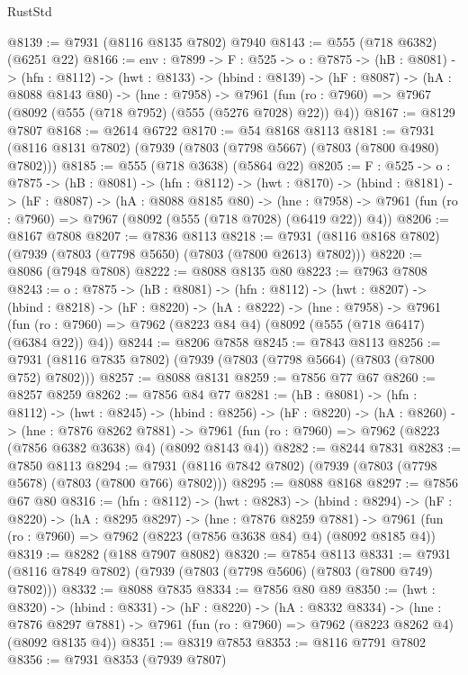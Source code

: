 \begin{lexlean}{RustStd}
\begin{coremodule}
@8139 := @7931 (@8116 @8135 @7802) @7940
@8143 := @555 (@718 @6382) (@6251 @22)
@8166 := {env : @7899} ->
  {F : @525} ->
  {o : @7875} ->
  (hB : @8081) ->
  (hfn : @8112) ->
  (hwt : @8133) ->
  (hbind : @8139) ->
  (hF : @8087) ->
  (hA : @8088 @8143 @80) ->
  (hne : @7958) ->
  @7961 (fun (ro : @7960) => @7967 (@8092 (@555 (@718 @7952) (@555 (@5276 @7028) @22)) @4))
@8167 := @8129 @7807
@8168 := @2614 @6722
@8170 := @54 @8168 @8113
@8181 := @7931 (@8116 @8131 @7802) (@7939 (@7803 (@7798 @5667) (@7803 (@7800 @4980) @7802)))
@8185 := @555 (@718 @3638) (@5864 @22)
@8205 := {F : @525} ->
  {o : @7875} ->
  (hB : @8081) ->
  (hfn : @8112) ->
  (hwt : @8170) ->
  (hbind : @8181) ->
  (hF : @8087) ->
  (hA : @8088 @8185 @80) ->
  (hne : @7958) -> @7961 (fun (ro : @7960) => @7967 (@8092 (@555 (@718 @7028) (@6419 @22)) @4))
@8206 := @8167 @7808
@8207 := @7836 @8113
@8218 := @7931 (@8116 @8168 @7802) (@7939 (@7803 (@7798 @5650) (@7803 (@7800 @2613) @7802)))
@8220 := @8086 (@7948 @7808)
@8222 := @8088 @8135 @80
@8223 := @7963 @7808
@8243 := {o : @7875} ->
  (hB : @8081) ->
  (hfn : @8112) ->
  (hwt : @8207) ->
  (hbind : @8218) ->
  (hF : @8220) ->
  (hA : @8222) ->
  (hne : @7958) ->
  @7961 (fun (ro : @7960) => @7962 (@8223 @84 @4) (@8092 (@555 (@718 @6417) (@6384 @22)) @4))
@8244 := @8206 @7858
@8245 := @7843 @8113
@8256 := @7931 (@8116 @7835 @7802) (@7939 (@7803 (@7798 @5664) (@7803 (@7800 @752) @7802)))
@8257 := @8088 @8131
@8259 := @7856 @77 @67
@8260 := @8257 @8259
@8262 := @7856 @84 @77
@8281 := (hB : @8081) ->
  (hfn : @8112) ->
  (hwt : @8245) ->
  (hbind : @8256) ->
  (hF : @8220) ->
  (hA : @8260) ->
  (hne : @7876 @8262 @7881) ->
  @7961 (fun (ro : @7960) => @7962 (@8223 (@7856 @6382 @3638) @4) (@8092 @8143 @4))
@8282 := @8244 @7831
@8283 := @7850 @8113
@8294 := @7931 (@8116 @7842 @7802) (@7939 (@7803 (@7798 @5678) (@7803 (@7800 @766) @7802)))
@8295 := @8088 @8168
@8297 := @7856 @67 @80
@8316 := (hfn : @8112) ->
  (hwt : @8283) ->
  (hbind : @8294) ->
  (hF : @8220) ->
  (hA : @8295 @8297) ->
  (hne : @7876 @8259 @7881) ->
  @7961 (fun (ro : @7960) => @7962 (@8223 (@7856 @3638 @84) @4) (@8092 @8185 @4))
@8319 := @8282 (@188 @7907 @8082)
@8320 := @7854 @8113
@8331 := @7931 (@8116 @7849 @7802) (@7939 (@7803 (@7798 @5606) (@7803 (@7800 @749) @7802)))
@8332 := @8088 @7835
@8334 := @7856 @80 @89
@8350 := (hwt : @8320) ->
  (hbind : @8331) ->
  (hF : @8220) ->
  (hA : @8332 @8334) ->
  (hne : @7876 @8297 @7881) -> @7961 (fun (ro : @7960) => @7962 (@8223 @8262 @4) (@8092 @8135 @4))
@8351 := @8319 @7853
@8353 := @8116 @7791 @7802
@8356 := @7931 @8353 (@7939 @7807)

\end{coremodule}
\end{lexlean}
